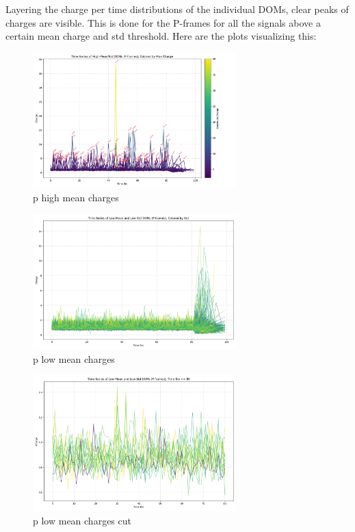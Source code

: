Layering the charge per time distributions of the individual DOMs, clear peaks of charges are visible. This is done for the P-frames for all the signals above a 
certain mean charge and std threshold. Here are the plots visualizing this:

\begin{figure}
    \centering
    \includegraphics[width=0.7\textwidth]{Plots/p_high_mean_charges_t.png}
    \caption{p high mean charges}
\end{figure}
\begin{figure}
    \centering
    \includegraphics[width=0.7\textwidth]{Plots/q_high_mean_charges_t.png}
    \caption{p low mean charges}
\end{figure}
\begin{figure}
    \centering
    \includegraphics[width=0.7\textwidth]{Plots/q_high_mean_charges_t80.png}
    \caption{p low mean charges cut}
\end{figure}


